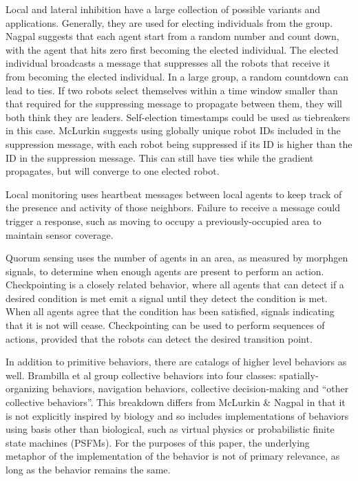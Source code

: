 \documentclass[]{article}
\begin{document}
Local and lateral inhibition have a large collection of possible variants and applications. 
Generally, they are used for electing individuals from the group. 
Nagpal suggests that each agent start from a random number and count down, with the agent that hits zero first becoming the elected individual. 
The elected individual broadcasts a message that suppresses all the robots that receive it from becoming the elected individual. 
In a large group, a random countdown can lead to ties.
If two robots select themselves within a time window smaller than that required for the suppressing message to propagate between them, they will both think they are leaders.
Self-election timestamps could be used as tiebreakers in this case. 
McLurkin suggests using globally unique robot IDs included in the suppression message, with each robot being suppressed if its ID is higher than the ID in the suppression message.
This can still have ties while the gradient propagates, but will converge to one elected robot.
 
Local monitoring uses heartbeat messages between local agents to keep track of the presence and activity of those neighbors. Failure to receive a message could trigger a response, such as moving to occupy a previously-occupied area to maintain sensor coverage.

Quorum sensing uses the number of agents in an area, as measured by morphgen signals, to determine when enough agents are present to perform an action. 
Checkpointing is a closely related behavior, where all agents that can detect if a desired condition is met emit a signal until they detect the condition is met. 
When all agents agree that the condition has been satisfied, signals indicating that it is not will cease. 
Checkpointing can be used to perform sequences of actions, provided that the robots can detect the desired transition point. 




In addition to primitive behaviors, there are catalogs of higher level behaviors as well. 
Brambilla et al group collective behaviors into four classes: spatially-organizing behaviors, navigation behaviors, collective decision-making and ``other collective behaviors''.
This breakdown differs from McLurkin \& Nagpal in that it is not explicitly inspired by biology and so includes implementations of behaviors using basis other than biological, such as virtual physics or probabilistic finite state machines (PSFMs). 
For the purposes of this paper, the underlying metaphor of the implementation of the behavior is not of primary relevance, as long as the behavior remains the same. 
\end{document}
